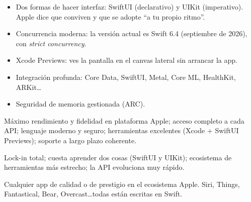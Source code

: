 \begin{itemize}[leftmargin=*,itemsep=0.2em,topsep=0.2em]
  \item Dos formas de hacer interfaz: SwiftUI (declarativo) y UIKit (imperativo). Apple dice que conviven y que se adopte \enquote{a tu propio ritmo}.
  \item Concurrencia moderna: la versión actual es Swift 6.4 (septiembre de 2026), con \emph{strict concurrency}.
  \item Xcode Previews: ves la pantalla en el canvas lateral sin arrancar la app.
  \item Integración profunda: Core Data, SwiftUI, Metal, Core ML, HealthKit, ARKit\ldots
  \item Seguridad de memoria gestionada (ARC).
\end{itemize}

 Máximo rendimiento y fidelidad en plataforma Apple; acceso completo a cada API; lenguaje moderno y seguro; herramientas excelentes (Xcode + SwiftUI Previews); soporte a largo plazo coherente.

 Lock-in total; cuesta aprender dos cosas (SwiftUI y UIKit); ecosistema de herramientas más estrecho; la API evoluciona muy rápido.

 Cualquier app de calidad o de prestigio en el ecosistema Apple. Siri, Things, Fantastical, Bear, Overcast\ldots todas están escritas en Swift.